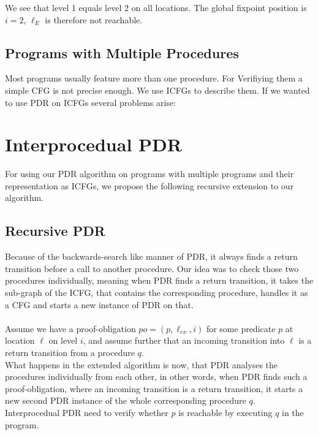 \documentclass{article}
\newcommand\mycom[1]{}
\newcommand\mycom[1]{#1}
\newcommand{\jw}[1]{\mycom{\todo[color=blue!40,inline]{\small JW: #1}}}
\begin{document}
	\hspace*{5cm}
	
	We see that level 1 equals level 2 on all locations. The global fixpoint position is $i = 2$, $\ell_E$ is therefore not reachable.
	
	\subsection{Programs with Multiple Procedures}
	Most programs usually feature more than one procedure. For Verifiying them a simple CFG is not precise enough. We use ICFGs to describe them. If we wanted to use PDR on ICFGs several problems arise:
	\jw{Explain why normal PDR does not work on procedures.}
	
	\section{Interprocedual PDR}
	For using our PDR algorithm on programs with multiple programs and their representation as ICFGs, we propose the following recursive extension to our algorithm.
	\subsection{Recursive PDR}
	Because of the backwards-search like manner of PDR, it always finds a return transition before a call to another procedure. Our idea was to check those two procedures individually, meaning when PDR finds a return transition, it takes the sub-graph of the ICFG, that contains the corresponding procedure, handles it as a CFG and starts a new instance of PDR on that. \\ \\
	Assume we have a proof-obligation $po = (p, \ell_{ex}, i)$ for some predicate $p$ at location $\ell$ on level $i$, and assume further that an incoming transition into $\ell$ is a return transition from a procedure $q$. \\
	What happens in the extended algorithm is now, that PDR analyses the procedures individually from each other, in other words, when PDR finds such a proof-obligation, where an incoming transition is a return transition, it starts a new second PDR instance of the whole corresponding procedure $q$. \\
	Interprocedual PDR need to verify whether $p$ is reachable by executing $q$ in the program. \\
	
\end{document}
